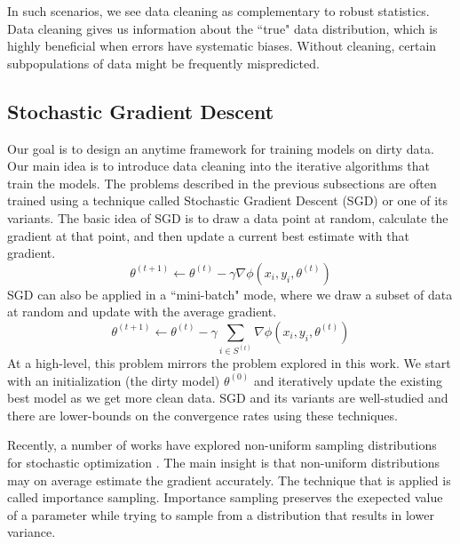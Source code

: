 In such scenarios, we see data cleaning as complementary to robust statistics.
Data cleaning gives us information about the ``true" data distribution, which is highly beneficial when errors have systematic biases.
Without cleaning, certain subpopulations of data might be frequently mispredicted. 

\subsection{Stochastic Gradient Descent}
Our goal is to design an anytime framework for training models on dirty data.
Our main idea is to introduce data cleaning into the iterative algorithms that train the models. 
The problems described in the previous subsections are often trained using a technique called Stochastic Gradient Descent (SGD) or one of its variants.
The basic idea of SGD is to draw a data point at random, calculate the gradient at that point, and then update a current best estimate with that gradient.
\[
\theta^{(t+1)}\leftarrow\theta^{(t)}-\gamma\nabla\phi(x_{i},y_{i},\theta^{(t)})
\]
 SGD can also be applied in a ``mini-batch" mode, where we draw a subset of data at random and update with the average gradient.
 \[
 \theta^{(t+1)}\leftarrow\theta^{(t)}-\gamma\sum_{i\in S^{(t)}}\nabla\phi(x_{i},y_{i},\theta^{(t)})
 \]
 At a high-level, this problem mirrors the problem explored in this work. We start with an initialization (the dirty model) $\theta^{(0)}$ and iteratively update the existing best model as we get more clean data. 
SGD and its variants are well-studied and there are lower-bounds on the convergence rates using these techniques. 

Recently, a number of works have explored non-uniform sampling distributions for stochastic optimization \cite{zhao2014stochastic, qu2014randomized}.
The main insight is that non-uniform distributions may on average estimate the gradient accurately.
The technique that is applied is called importance sampling.
Importance sampling preserves the exepected value of a parameter while trying to sample from a distribution that results in lower variance.





 